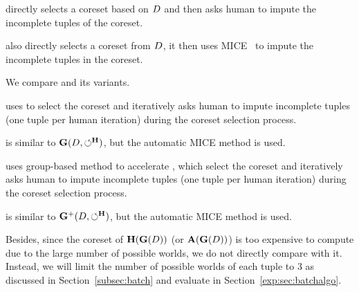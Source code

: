  directly selects a coreset based on $D$ and then asks human to impute the incomplete tuples of the coreset.

 also directly selects a coreset from $D$, it then uses MICE~\cite{royston2011multiple} to impute the incomplete tuples in the coreset.

 We compare \ours and its variants.

 uses \ours to select the coreset and iteratively asks human to impute incomplete tuples (one tuple per human iteration) during the coreset selection process.

 is similar to $\mathbf{G}(D,\circlearrowleft^\mathbf{H})$, but the automatic  MICE  method is used.

 uses group-based method to accelerate \ours, which select the coreset and iteratively asks human to impute incomplete tuples (one tuple per human iteration) during the coreset selection process.

 is similar to $\mathbf{G}^+(D,\circlearrowleft^\mathbf{H})$, but the automatic  MICE  method is used.

Besides, since the coreset of $\mathbf{H}(\mathbf{G}(D))$ (or $\mathbf{A}(\mathbf{G}(D))$) is too expensive to compute due to the large number of possible worlds, we do not directly compare with it. Instead, we will limit the number of possible worlds of each tuple to 3 as discussed in Section~\ref{subsec:batch} and evaluate in Section~\ref{exp:sec:batchalgo}.



 







